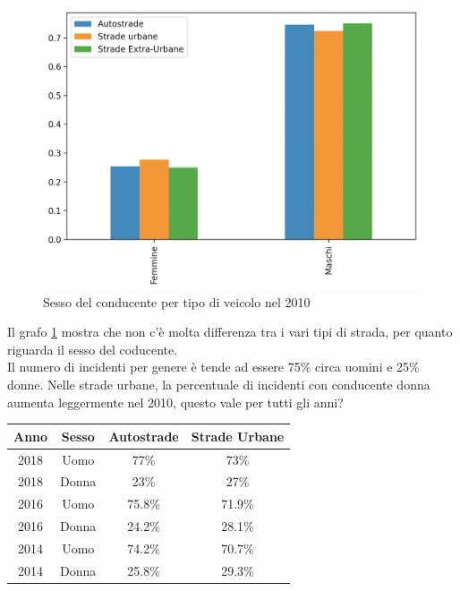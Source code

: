 \documentclass[a4paper]{report}
\begin{document}
\begin{figure}
    \includegraphics[width=\linewidth]{../src/incidenti/incidenti_senza_coords/tipo_veicoli/uomo-donna.png}
    \caption{Sesso del conducente per tipo di veicolo nel 2010}
    \label{fig:differenza-uomo-donna}
\end{figure}

Il grafo \ref{fig:differenza-uomo-donna} mostra che non c'è molta differenza tra i vari tipi di 
strada, per quanto riguarda il sesso del coducente.\\
Il numero di incidenti per genere è tende ad essere 75\% circa uomini e 25\% donne.
Nelle strade  urbane, la percentuale di incidenti con conducente donna aumenta leggermente nel 2010, 
questo vale per tutti gli anni?

\begin{center}
    \def\arraystretch{1.5}%
    \begin{tabular}{ |c|c|c|c| }
        \hline
        Anno & Sesso & Autostrade & Strade Urbane \\ 
        \hline
        \rowcolor{TableGray}
        2018 & Uomo & 77\%  & 73\% \\
        2018 & Donna & 23\% & 27\% \\
        \rowcolor{TableGray}
        2016 & Uomo & 75.8\%  & 71.9\% \\
        2016 & Donna & 24.2\% & 28.1\% \\
        \rowcolor{TableGray}
        2014 & Uomo & 74.2\%  & 70.7\% \\
        2014 & Donna & 25.8\% & 29.3\% \\
        \hline
    \end{tabular}
\end{center}
\end{document}
